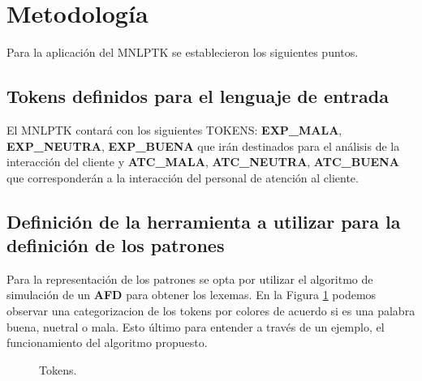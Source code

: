 \documentclass[twocolumn, fontsize=10pt]{article}
\begin{document}
\section{Metodología}
Para la aplicación del MNLPTK se establecieron los siguientes puntos.

\subsection{Tokens definidos para el lenguaje de entrada}
El MNLPTK contará con los siguientes TOKENS: \textbf{EXP\_MALA}, \textbf{EXP\_NEUTRA}, \textbf{EXP\_BUENA} que irán destinados para el análisis de la interacción del cliente y \textbf{ATC\_MALA}, \textbf{ATC\_NEUTRA}, \textbf{ATC\_BUENA} que corresponderán a la interacción del personal de atención al cliente.

\subsection{Definición de la herramienta a utilizar para la definición de los patrones}
Para la representación de los patrones se opta por utilizar el algoritmo de simulación de un \textbf{AFD} para obtener los lexemas. En la Figura \ref{fig:tokens} podemos observar una categorizacion de los tokens por colores de acuerdo si es una palabra buena, nuetral o mala. Esto último para entender a través de un ejemplo, el funcionamiento del algoritmo propuesto. 

\setcounter{i}{0}


\begin{figure}[H]
  \centering
	\caption{Tokens.}
	\label{fig:tokens}
\end{figure}
\end{document}
